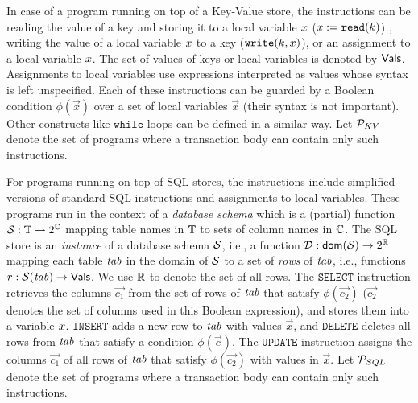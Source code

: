 In case of a program running on top of a Key-Value store, the instructions can be reading the value of a key and storing it to a local variable ${x}$ (${x} := \mathtt{read}(k)$) , writing the value of a local variable ${x}$ to a key ($\mathtt{write}(k,{x})$), or an assignment to a local variable ${x}$. The set of values of keys or local variables is denoted by $\mathsf{Vals}$. Assignments to local variables use expressions interpreted as values whose syntax is left unspecified. Each of these instructions can be guarded by a Boolean condition $\phi(\vec{x})$ over a set of local variables $\vec{x}$ (their syntax is not important). Other constructs like $\mathtt{while}$ loops can be defined in a similar way. Let $\mathcal{P}_{KV}$ denote the set of programs where a transaction body can contain only such instructions.

For programs running on top of SQL stores, the instructions include simplified
versions of standard SQL instructions and assignments to local variables. These
programs run in the context of a \emph{database schema} which is a (partial)
function $\mathcal{S}:\mathbb{T}\rightharpoonup 2^{\mathbb{C}}$ mapping table names in
$\mathbb{T}$ to sets of column names in $\mathbb{C}$. The SQL store is an
\emph{instance} of a database schema $\mathcal{S}$, i.e., a function $\mathcal{D}:
\mathsf{dom}(\mathcal{S})\rightarrow 2^{\mathbb{R}}$ mapping each table $\mathit{tab}$ in the
domain of $\mathcal{S}$ to a set of \emph{rows} of $\mathit{tab}$, i.e., functions $r:\mathcal{S}(\mathit{tab})\rightarrow\mathsf{Vals}$. We use $\mathbb{R}$ to denote the set of all rows.
The $\mathtt{SELECT}$ instruction retrieves the columns $\vec{c_1}$ from the set of rows of $\mathit{tab}$ that satisfy $\phi(\vec{c_2})$ ($\vec{c_2}$ denotes the set of columns used in this Boolean expression), and stores them into a variable ${x}$. $\mathtt{INSERT}$ adds a new row to $\mathit{tab}$ with values $\vec{x}$, and $\mathtt{DELETE}$ deletes all rows from $\mathit{tab}$ that satisfy a condition $\phi(\vec{c})$. The $\mathtt{UPDATE}$ instruction assigns the columns $\vec{c_1}$ of all rows of $\mathit{tab}$ that satisfy $\phi(\vec{c_2})$ with values in $\vec{x}$.
Let $\mathcal{P}_{SQL}$ denote the set of programs where a transaction body can contain only such instructions.
